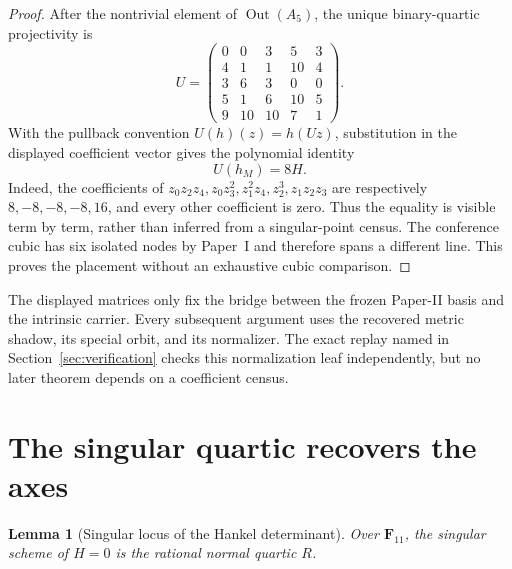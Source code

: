 \documentclass[11pt]{article}
\newtheorem{lemma}[theorem]{Lemma}
\theoremstyle{definition}
\theoremstyle{remark}
\newcommand{\F}{\mathbf F}
\begin{document}
\begin{proof}
After the nontrivial element of \(\operatorname{Out}(A_5)\), the unique
binary-quartic projectivity is
\[
 U=\begin{pmatrix}
 0&0&3&5&3\\
 4&1&1&10&4\\
 3&6&3&0&0\\
 5&1&6&10&5\\
 9&10&10&7&1
 \end{pmatrix}.
\]
With the pullback convention \(U(h)(z)=h(Uz)\), substitution in the displayed
coefficient vector gives the polynomial identity
\[
                         U(h_M)=8H.
\]
Indeed, the coefficients of
\(z_0z_2z_4,z_0z_3^2,z_1^2z_4,z_2^3,z_1z_2z_3\) are respectively
\(8,-8,-8,-8,16\), and every other coefficient is zero.  Thus the equality
is visible term by term, rather than inferred from a singular-point census.
The conference cubic has six isolated
nodes by Paper~I and therefore spans a different line.  This proves the
placement without an exhaustive cubic comparison.
\end{proof}

The displayed matrices only fix the bridge between the frozen Paper-II basis
and the intrinsic carrier.  Every subsequent argument uses the recovered
metric shadow, its special orbit, and its normalizer.  The exact replay named
in Section~\ref{sec:verification} checks this normalization leaf
independently, but no later theorem depends on a coefficient census.

\section{The singular quartic recovers the axes}
\label{sec:singular}

\begin{lemma}[Singular locus of the Hankel determinant]
\label{lem:hankel-singular-locus}
Over \(\F_{11}\), the singular scheme of \(H=0\) is the rational normal
quartic \(R\).
\end{lemma}
\end{document}
